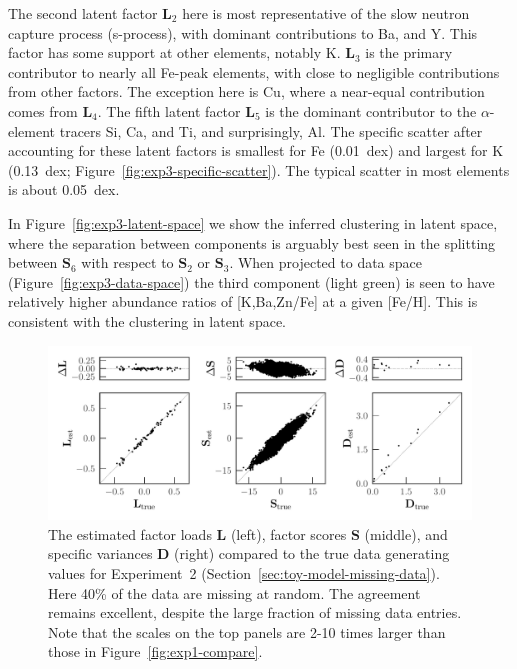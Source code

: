 \documentclass[twocolumn]{aastex62}
\newcommand{\vect}[1]{\boldsymbol{\mathbf{#1}}}
\renewcommand{\vec}[1]{\vect{#1}}
\newcommand{\factorloads}{\textbf{L}}
\newcommand{\factorscores}{\textbf{S}}
\newcommand{\specificvariance}{\vec{D}}
\begin{document}
The second latent factor $\mathbf{L}_2$ here is most representative of the slow neutron capture process (s-process), with dominant contributions to Ba, and Y. This factor has some support at other elements, notably K. $\mathbf{L}_3$ is the primary contributor to nearly all Fe-peak elements, with close to negligible contributions from other factors. The exception here is Cu, where a near-equal contribution comes from $\mathbf{L}_4$.
The fifth latent factor $\mathbf{L}_5$ is the dominant contributor to the $\alpha$-element tracers Si, Ca, and Ti, and surprisingly, Al. 
The specific scatter after accounting for these latent factors is smallest
for Fe (0.01~dex) and largest for K (0.13~dex; Figure~\ref{fig:exp3-specific-scatter}). The typical scatter in most elements is about 0.05~dex.

In Figure~\ref{fig:exp3-latent-space} we show the inferred clustering in latent space,
where the separation between components is arguably best seen in the splitting between $\factorscores_6$ with respect to $\factorscores_2$ or $\factorscores_3$. When projected to data space (Figure~\ref{fig:exp3-data-space}) the third component (light green) is seen to have relatively higher abundance ratios of [K,Ba,Zn/Fe] at a given [Fe/H]. This is consistent with the clustering in latent space.


\begin{figure}[t!]
	\includegraphics[width=\textwidth]{experiments/eval-figs/eval-3-missing-data-40.pdf}
	\caption{The estimated factor loads $\factorloads$ (left), factor scores $\factorscores$ (middle),
    		 and specific variances $\specificvariance$ (right) compared to the 
		 	 true data generating values
		 	 for Experiment~2 (Section~\ref{sec:toy-model-missing-data}). Here 40\% of the data are missing at random.
			 The agreement remains excellent,
			 despite the large fraction of missing data entries. Note that the scales on the top panels are 2-10 times larger than those in Figure~\ref{fig:exp1-compare}.}
    \label{fig:exp1-missing-data}
\end{figure}
\end{document}
